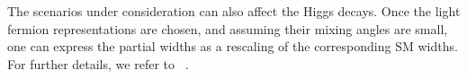 The scenarios under consideration can also affect the Higgs decays. Once the light fermion representations are chosen, and assuming their mixing angles are small, one can express the partial widths as
a rescaling of the corresponding SM widths. For further details, we refer to ~\cite{MCHMtthh}.


%
%

%
%


